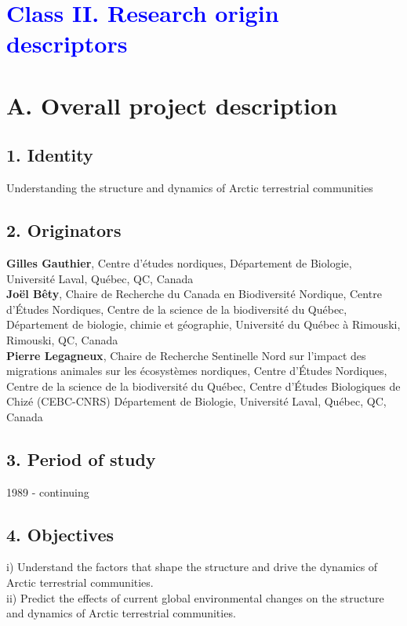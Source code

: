 \documentclass[a4paper,twoside,12pt]{article}
\begin{document}
\section*{\textcolor{Blue}{Class II. Research origin descriptors}}
    \section*{A. Overall project description}
    \subsection*{1. Identity} Understanding the structure and dynamics of Arctic terrestrial communities
        \subsection*{2. Originators}   
        \textbf{Gilles Gauthier}, Centre d’études nordiques, Département de Biologie, Université Laval, Québec, QC, Canada\\
                \textbf{Joël Bêty},  Chaire de Recherche du Canada en Biodiversité Nordique, Centre d’Études Nordiques, Centre de la science de la biodiversité du Québec, Département de biologie, chimie et géographie, Université du Québec à Rimouski, Rimouski, QC, Canada \\
                \textbf{Pierre Legagneux}, Chaire de Recherche Sentinelle Nord sur l’impact des migrations animales sur les écosystèmes nordiques, Centre d’Études Nordiques, Centre de la science de la biodiversité du Québec, Centre d’Études Biologiques de Chizé (CEBC-CNRS) Département de Biologie, Université Laval, Québec, QC, Canada
        
        \subsection*{3. Period of study} 1989 - continuing
        
        \subsection*{4. Objectives}
       i) Understand the factors that shape the structure and drive the dynamics of Arctic terrestrial communities.\\
       ii) Predict the effects of current global environmental changes on the structure and dynamics of Arctic terrestrial communities.
       
\end{document}
